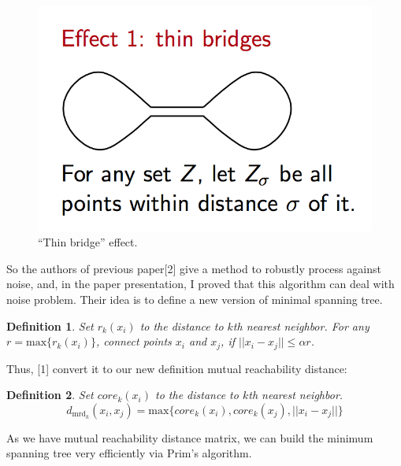 \documentclass{article}
\newtheorem{definition}{Definition}
\begin{document}
	\begin{figure}[h!]
		\centering
		\includegraphics[scale=0.35]{a.png}
		\caption{``Thin bridge'' effect.}
		\label{fig:slabfig}
	\end{figure}
	
	So the authors of previous paper[2] give a method to robustly process against noise, and, in the paper presentation, I proved that this algorithm can deal with noise problem. Their idea is to define a new version of minimal spanning tree.
	
		\begin{definition}
			Set $r_k(x_i)$ to the distance to $k$th nearest neighbor. For any $r = \mathrm{max}\{r_k(x_i)\}$, connect points $x_i$ and $x_j$, if $||x_i - x_j|| \leq \alpha r$.
		\end{definition}
	
	Thus, [1] convert it to our new definition mutual reachability distance:
	
		\begin{definition}
			Set $core_k(x_i)$ to the distance to $k$th nearest neighbor.
			$$d_{\mathrm{mrd}_k}(x_i, x_j) = \mathrm{max}\{core_k(x_i), core_k(x_j), ||x_i - x_j||\}$$
		\end{definition}
	
	As we have mutual reachability distance matrix, we can build the minimum spanning tree very efficiently via Prim's algorithm.
	
\end{document}
